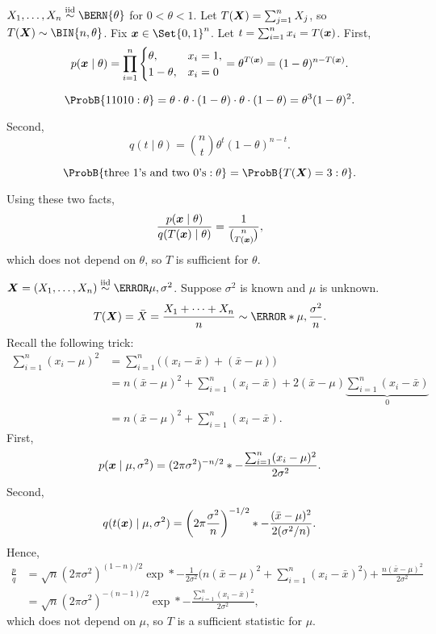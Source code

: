 \begin{Example}{}{}
    $ X_1,\ldots,X_n \iid \BERN{\theta} $ for $ 0<\theta<1 $. Let
    $ T(\bm{X})=\sum_{j=1}^{n}X_j $, so
    $ T(\Vector{X})\sim\BIN{n,\theta} $. Fix $ \Vector{x}\in\Set{0,1}^n $. Let
    $ t=\sum_{i=1}^{n}x_i=T(\bm{x}) $. First,
    \[ p(\bm{x}\mid \theta)=\prod_{i=1}^n
        \begin{cases}
            \theta,   & x_i=1, \\
            1-\theta, & x_i=0
        \end{cases}=
        \theta^{T(\bm{x})}=(1-\theta)^{n-T(\bm{x})}. \]
    \begin{Remark}{}{}
        \[ \ProbB{11010 \given \theta}=\theta\cdot \theta\cdot (1-\theta)\cdot \theta\cdot(1-\theta)=\theta^3(1-\theta)^2. \]
    \end{Remark}
    Second,
    \[ q(t\mid \theta)=\binom{n}{t}\theta^t(1-\theta)^{n-t}. \]
    \begin{Remark}{}{}
        \[ \ProbB{\text{three 1's and two 0's}\given \theta}=\ProbB{T(\Vector{X})=3\given \theta}. \]
    \end{Remark}
    Using these two facts,
    \[ \frac{p(\bm{x}\mid \theta)}{q(T(\bm{x})\mid \theta)}=\frac{1}{\binom{n}{T(\bm{x})}}, \]
    which does not depend on $ \theta $, so $ T $ is sufficient for $ \theta $.
\end{Example}
\begin{Example}{}{}
    $ \Vector{X}=(X_1,\ldots,X_n)\iid \N{\mu,\sigma^2} $. Suppose $ \sigma^2 $
    is known and $ \mu $ is unknown.
    \[ T(\Vector{X})=\bar{X}=\frac{X_1+\cdots+X_n}{n} \sim \N*{\mu,\frac{\sigma^2}{n}}. \]
    Recall the following trick:
    \begin{align*}
        \sum_{i=1}^{n}(x_i-\mu)^2
         & =\sum_{i=1}^{n}\bigl((x_i-\bar{x})+(\bar{x}-\mu)\bigr)  \\
         & =n(\bar{x}-\mu)^2+\sum_{i=1}^{n}(x_i-\bar{x})+
        2(\bar{x}-\mu)\underbrace{\sum_{i=1}^{n}(x_i-\bar{x})}_{0} \\
         & =n(\bar{x}-\mu)^2+\sum_{i=1}^{n}(x_i-\bar{x}).
    \end{align*}
    First,
    \[ p(\bm{x}\mid \mu,\sigma^2)
        =(2\pi\sigma^2)^{-n/2}\relax*{-\frac{\sum_{i=1}^{n}(x_i-\mu)^2}{2\sigma^2}}. \]
    Second,
    \[ q(t(\bm{x})\mid \mu,\sigma^2)
        =\biggl(2\pi \frac{\sigma^2}{n}\biggr)^{-1/2}\relax*{-\frac{(\bar{x}-\mu)^2}{2(\sigma^2/n)}}. \]
    Hence,
    \begin{align*}
        \frac{p}{q}
         & =\sqrt{n}(2\pi\sigma^2)^{(1-n)/2}
        \exp*{-\frac{1}{2\sigma^2}
        \biggl(n(\bar{x}-\mu)^2+\sum_{i=1}^{n}(x_i-\bar{x})^2\biggr)+\frac{n(\bar{x}-\mu)^2}{2\sigma^2}} \\
         & =\sqrt{n}(2\pi\sigma^2)^{-(n-1)/2}\exp*{-\frac{\sum_{i=1}^{n}(x_i-\bar{x})^2}{2\sigma^2}},
    \end{align*}
    which does not depend on $ \mu $, so $ T $ is a sufficient statistic for $ \mu $.
\end{Example}
